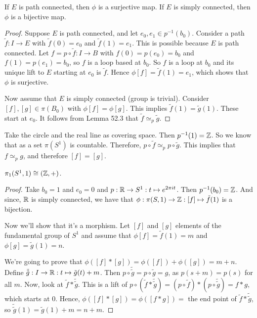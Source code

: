 \begin{theorem}[54.4]
    If $E$ is path connected, then $\phi$ is a surjective map.
    If $E$ is simply connected, then $\phi$ is a bijective map.
\end{theorem}
\begin{proof}
    Suppose $E$ is path connected, and let $e_0, e_1 \in p ^{-1} (b_0)$.
    Consider a path $\tilde f: I \to  E$ with $\tilde f(0) = e_0$ and $\tilde f(1) = e_1$. This is possible because $E$ is path connected.
    Let $f = p  \circ \tilde f: I \to B$ with $f(0) = p(e_0) = b_0$ and $f(1) = p(e_1) = b_0$, so $f$ is a loop based at  $b_0$.
    So $f$ is a loop at $b_0$ and its unique lift to $E$ starting at $e_0$ is $\tilde f$.
    Hence  $\phi[f] = \tilde f(1) = e_1$,
    which shows that $\phi$ is surjective.

    Now assume that $E$ is simply connected (group is trivial).
    Consider $[f], [g] \in \pi(B_0)$ with $\phi[f] = \phi[g]$.
    This implies  $\tilde f(1) = \tilde g(1)$.
    These start at $e_0$.
    It follows from Lemma 52.3 that $\tilde f \simeq_p \tilde g$.
\end{proof}

\begin{eg}
    Take the circle and the real line as covering space. Then $p ^{-1}(1) = \mathbb{Z}$.
    So we know that as a set $\pi(S^{1})$ is countable.
    Therefore, $p  \circ  \tilde f \simeq_p p  \circ  \tilde g $.
    This implies that $f \simeq_p  g$, and therefore $[f] = [g]$.
\end{eg}



\begin{theorem}
    $\pi_1(S^{1}, 1) \cong (\mathbb{Z}, +)$.
\end{theorem}
\begin{proof}
    Take $b_0 = 1$ and $e_0=0$ and $p: \mathbb{R} \to S^{1}: t \mapsto e^{2 \pi i t}$.
    Then $p ^{-1}(b_0) = \mathbb{Z}$.
    And since, $\mathbb{R}$ is simply connected, we have that $\phi: \pi(S, 1) \to  \mathbb{Z}: [f] \mapsto  \tilde f(1)$ is a bijection.

    Now we'll show that it's a morphism.
    Let $[f]$ and $[g]$ elements of the fundamental group of $S^1$ and assume that $\phi[f] = \tilde f(1) = m$ and $\phi[g] = \tilde g(1) = n$.

    We're going to prove that $\phi([f]*[g]) = \phi([f]) + \phi([g]) = m + n$. 
    Define $\tilde{\tilde g}: I \to  \mathbb{R}: t \mapsto  \tilde g(t) + m$.
    Then $p \circ \tilde{\tilde g} = p  \circ  \tilde g = g$, as $p(s+m) = p(s)$ for all  $m$.
    Now, look at $\tilde f * \tilde{\tilde g}$.
    This is a lift of $p  \circ (\tilde f * \tilde{\tilde g}) = (p  \circ  \tilde f) * (p  \circ  \tilde{\tilde{g}}) = f*g$, which starts at $0$.
    Hence, $\phi([f]*[g]) = \phi([f*g]) = $ the end point of  $\tilde f * \tilde{\tilde g}$, so  $\tilde{\tilde{g}}(1) = \tilde g(1) + m = n + m$.
\end{proof}

